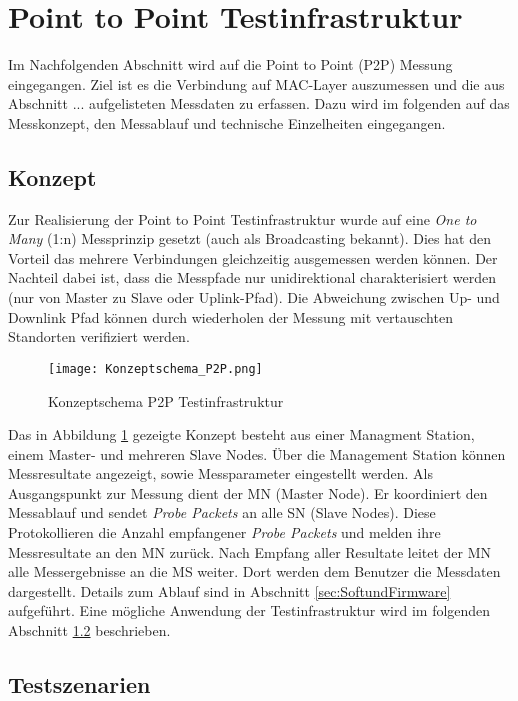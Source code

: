 \clearpage
\section{Point to Point Testinfrastruktur}\label{sec:PointtoPointTestinfrastruktur}

Im Nachfolgenden Abschnitt wird auf die Point to Point (P2P) Messung eingegangen. Ziel ist es die Verbindung auf MAC-Layer auszumessen und die aus Abschnitt ... aufgelisteten Messdaten zu erfassen. Dazu wird im folgenden auf das Messkonzept, den Messablauf und technische Einzelheiten eingegangen. 

\subsection{Konzept}\label{sec:KonzeptP2P}

Zur Realisierung der Point to Point Testinfrastruktur wurde auf eine \textit{One to Many} (1:n) Messprinzip gesetzt (auch als Broadcasting bekannt). Dies hat den Vorteil das mehrere Verbindungen gleichzeitig ausgemessen werden können. Der Nachteil dabei ist, dass die Messpfade nur unidirektional charakterisiert werden (nur von Master zu Slave oder Uplink-Pfad). Die Abweichung zwischen Up- und Downlink Pfad können durch wiederholen der Messung mit vertauschten Standorten verifiziert werden. 

\begin{figure} [H]
	\centering
	\texttt{[image: Konzeptschema\_P2P.png]}
	\caption{Konzeptschema P2P Testinfrastruktur}
	\label{fig:KonzeptschemaP2P}
\end{figure}

Das in Abbildung \ref{fig:KonzeptschemaP2P} gezeigte Konzept besteht aus einer Managment Station, einem Master- und mehreren Slave Nodes. Über die Management Station können Messresultate angezeigt, sowie Messparameter eingestellt werden. Als Ausgangspunkt zur Messung dient der MN (Master Node). Er koordiniert den Messablauf und sendet \textit{Probe Packets} an alle SN (Slave Nodes). Diese Protokollieren die Anzahl empfangener \textit{Probe Packets} und melden ihre Messresultate an den MN zurück. Nach Empfang aller Resultate leitet der MN alle Messergebnisse an die MS weiter. Dort werden dem Benutzer die Messdaten dargestellt. Details zum Ablauf sind in Abschnitt \ref{sec:SoftundFirmware} aufgeführt. Eine mögliche Anwendung der Testinfrastruktur wird im folgenden Abschnitt \ref{sec:TestszenarienP2P} beschrieben.  

\subsection{Testszenarien}\label{sec:TestszenarienP2P}

